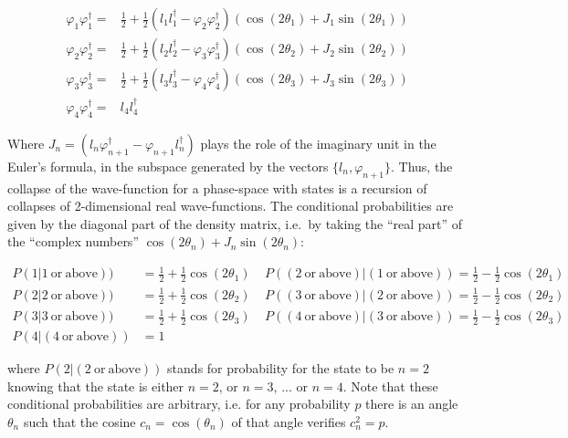 \documentclass[11pt]{book}
\begin{document}
\begin{equation}\begin{aligned}
    \varphi_{1}\varphi_{1}^\dagger=&\frac{1}{2}+\frac{1}{2}(l_{1}l_{1}^\dagger-\varphi_{2}\varphi_{2}^\dagger) (\cos(2\theta_{1})+J_{1}\sin(2\theta_{1}))\\
    \varphi_{2}\varphi_{2}^\dagger=&\frac{1}{2}+\frac{1}{2}(l_{2}l_{2}^\dagger-\varphi_{3}\varphi_{3}^\dagger) (\cos(2\theta_{2})+J_{2}\sin(2\theta_{2}))\\
    \varphi_{3}\varphi_{3}^\dagger=&\frac{1}{2}+\frac{1}{2}(l_{3}l_{3}^\dagger-\varphi_{4}\varphi_{4}^\dagger) (\cos(2\theta_{3})+J_{3}\sin(2\theta_{3}))\\   
    \varphi_{4}\varphi_{4}^\dagger=&l_{4}l_{4}^\dagger
\end{aligned}\end{equation}

Where \(J_n=(l_{n}\varphi_{n+1}^\dagger  -\varphi_{n+1}l_{n}^\dagger)\)
plays the role of the imaginary unit in the Euler's formula, in the
subspace generated by the vectors \(\{l_{n}, \varphi_{n+1}\}\). Thus,
the collapse of the wave-function for a phase-space with states is a
recursion of collapses of 2-dimensional real wave-functions. The
conditional probabilities are given by the diagonal part of the density
matrix, i.e.~by taking the ``real part'' of the ``complex numbers''
\(\cos(2\theta_n) +J_n\sin(2\theta_n)\):

\begin{equation}\begin{aligned}
    P( 1 | 1 \mathrm{\ or\ above}))&=\frac{1}{2}+\frac{1}{2}\cos(2\theta_{1})\ \ \ \ \ 
    P( (2 \mathrm{\ or\ above}) | (1 \mathrm{\ or\ above}))= \frac{1}{2}-\frac{1}{2}\cos(2\theta_{1})\\
    P( 2 | 2 \mathrm{\ or\ above}))&=\frac{1}{2}+\frac{1}{2}\cos(2\theta_{2})\ \ \ \ \ 
    P( (3 \mathrm{\ or\ above}) | (2 \mathrm{\ or\ above}))= \frac{1}{2}-\frac{1}{2}\cos(2\theta_{2})\\
    P( 3 | 3 \mathrm{\ or\ above}))&=\frac{1}{2}+\frac{1}{2}\cos(2\theta_{3})\ \ \ \ \ 
    P( (4 \mathrm{\ or\ above}) | (3 \mathrm{\ or\ above}))= \frac{1}{2}-\frac{1}{2}\cos(2\theta_{3})\\
    P( 4 | (4 \mathrm{\ or\ above}))&=1
\end{aligned}\end{equation}

where \(P( 2 | (2 \mathrm{\ or\ above}))\) stands for probability for
the state to be \(n=2\) knowing that the state is either \(n=2\), or
\(n=3\), ... or \(n=4\). Note that these conditional probabilities are
arbitrary, i.e. for any probability \(p\) there is an angle \(\theta_n\)
such that the cosine \(c_n=\cos(\theta_n)\) of that angle verifies
\(c_n^2=p\).
\end{document}
